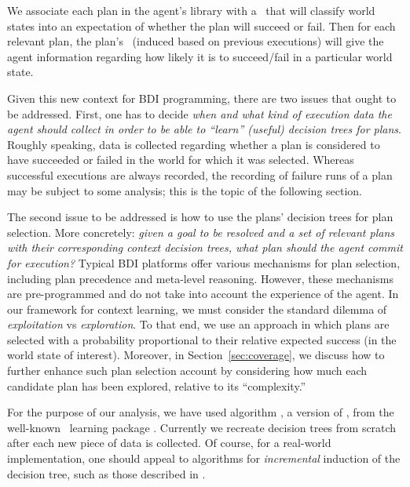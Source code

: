 We associate each plan in the agent's library with a \dt\ that will classify world
states into an expectation of whether the plan will succeed or fail. Then for
each relevant plan, the plan's \dt\ (induced based on previous executions) will
give the agent information regarding how likely it is to succeed/fail in a
particular world state.


Given this new context for BDI programming, there are two issues that ought to be
addressed.
First, one has to decide \emph{when and what kind of execution data the agent should
collect in order to be able to ``learn'' (useful) decision trees for plans}.
Roughly speaking, data is collected regarding whether a plan is considered to
have succeeded or failed in the world for which it was selected.
  Whereas successful executions are always recorded, the recording of failure
runs of a plan may be subject to some analysis; this is the topic of the following section.



The second issue to be addressed is how to use the plans' decision trees for plan
selection. More concretely: \emph{given a goal to be resolved and a set of
relevant plans with their corresponding context decision trees, what plan should
the agent commit for execution?}
Typical BDI platforms offer various mechanisms for plan selection, including plan
precedence and meta-level reasoning. However, these mechanisms are pre-programmed
and do not take into account the experience of the agent.
In our framework for context learning, we must consider the standard dilemma of
\emph{exploitation} vs \emph{exploration}. To that end, we use an 
approach in which plans are selected with a probability proportional to their relative expected
success (in the world state of interest). Moreover, in
Section~\ref{sec:coverage}, we discuss how to further enhance such plan selection
account by considering how much each candidate plan has been
explored, relative to its ``complexity.''



For the purpose of our analysis, we have used algorithm
, a version of  \cite{Mitchell97:ML}, from the
well-known \weka\ learning package \cite{weka99}. Currently we
recreate decision trees from scratch after each new piece of data is collected.
Of course, for a real-world implementation, one should appeal to algorithms for
\emph{incremental} induction of the decision tree, such as those described in
\cite{Swere06:Fast,Utgoff97Decision}.

